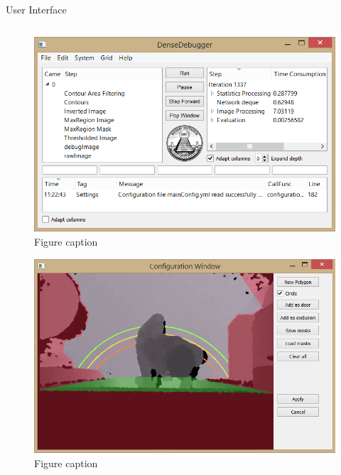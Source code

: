 \documentclass[final,hyperref={pdfpagelabels=false}]{beamer}
\begin{document}
\begin{frame}[t]
\begin{columns}[t]
\begin{column}{.465\textwidth}
\begin{block}{User Interface}
\begin{columns}
\begin{column}{.43\textwidth} %
\centering
\begin{figure}
\includegraphics[width=\linewidth]{PosterDebugger.png}
\caption{Figure caption}
\end{figure}
\begin{figure}
\includegraphics[width=\linewidth]{PosterConfig.png}
\caption{Figure caption}
\end{figure}
\end{column}
\end{columns} %

\end{block}


\end{column} %


\end{columns}
\end{frame}
\end{document}
